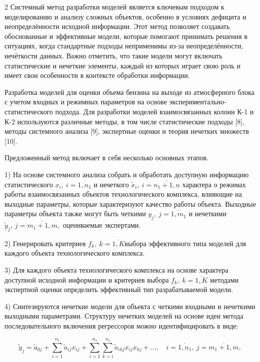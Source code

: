 \begin{multicols}{2}
Системный метод разработки моделей является ключевым подходом к
моделированию и анализу сложных объектов, особенно в условиях дефицита и
неопределённости исходной информации. Этот метод позволяет создавать
обоснованные и эффективные модели, которые помогают принимать решения в
ситуациях, когда стандартные подходы неприменимы из-за неопределённости,
нечёткости данных. Важно отметить, что такие модели могут включать
статистические и нечеткие элементы, каждый из которых играет свою роль и
имеет свои особенности в контексте обработки информации.

Разработка моделей для оценки объема бензина на выходе из атмосферного
блока с учетом входных и режимных параметров на основе
экспериментально-статистического подхода. Для разработки моделей
взаимосвязанных колонн К-1 и К-2 используются различные методы, в том
числе статистические подходы {[}8{]}, методы системного анализа {[}9{]},
экспертные оценки и теория нечетких множеств {[}10{]}.

Предложенный метод включает в себя несколько основных этапов.

1) На основе системного анализа собрать и обработать доступную
информацию статистического \(x_{i},\ i = \overline{1,n_{1}}\) и нечеткого
\({\widetilde{x}}_{i},\ i = \overline{n_{1} + 1,n}\) характера о режимах
работы взаимосвязанных объектов технологического комплекса, влияющие на
выходные параметры, которые характеризуют качество работы объекта.
Выходные параметры объекта также могут быть четкими
\(y_{j},\ j = \overline{1,m_{1}}\) и нечеткими
\({\widetilde{y}}_{j},\ j = \overline{m_{1} + 1,m},\) оцениваемые
экспертами.

2) Генерировать критериев \(f_{k},\ k = \overline{1,K}\)выбора
эффективного типа моделей для каждого объекта технологического
комплекса.

3) Для каждого объекта технологического комплекса на основе характера
доступной исходной информации и критериев выбора
\(f_{k},\ k = \overline{1,K}\) методами экспертной оценки определить
эффективный тип разрабатываемой модели.

4) Синтезируются нечеткие модели для объекта с четкими входными и
нечеткими выходными параметрами. Структуру нечетких моделей на основе
идеи метода последовательного включения регрессоров можно
идентифицировать в виде:
\end{multicols}
\vspace{-0.5em}
\begin{equation}
\tilde{y}_{j} = \tilde{a}_{0j} + \sum_{i=1}^{n_{1}} \tilde{a}_{ij} x_{ij} + \sum_{i=1}^{n_{1}} \sum_{k=i}^{n_{1}} \tilde{a}_{ikj} x_{ij} x_{kj} + \dots, \quad i = \overline{1, n_{1}}, \ j = \overline{m_{1}+1, m},
\end{equation}

